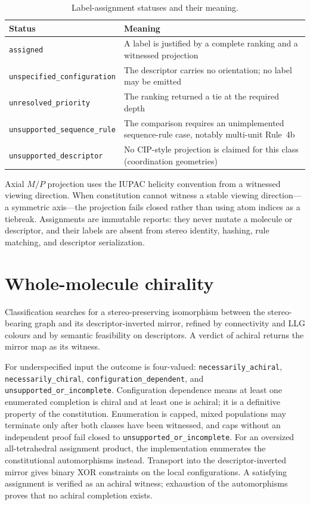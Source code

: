 \documentclass[pdflatex,sn-mathphys-num,referee,lineno]{sn-jnl}
\newcommand{\code}[1]{\texttt{#1}}
\theoremstyle{plain}
\theoremstyle{remark}
\theoremstyle{definition}
\begin{document}
\begin{table}[htbp]
\caption{Label-assignment statuses and their meaning.}
\label{tab:cipstatus}
\centering
\begin{tabularx}{\textwidth}{@{}lX@{}}
\toprule
Status & Meaning \\
\midrule
\code{assigned} & A label is justified by a complete ranking and a witnessed projection \\
\code{unspecified\_configuration} & The descriptor carries no orientation; no label may be emitted \\
\code{unresolved\_priority} & The ranking returned a tie at the required depth \\
\code{unsupported\_sequence\_rule} & The comparison requires an unimplemented sequence-rule case, notably multi-unit Rule~4b \\
\code{unsupported\_descriptor} & No CIP-style projection is claimed for this class (coordination geometries) \\
\bottomrule
\end{tabularx}
\end{table}

Axial \(M/P\) projection uses the IUPAC helicity convention from a witnessed
viewing direction.  When constitution cannot witness a stable viewing
direction---a symmetric axis---the projection fails closed rather than using
atom indices as a tiebreak.  Assignments are immutable reports: they never
mutate a molecule or descriptor, and their labels are absent from stereo
identity, hashing, rule matching, and descriptor serialization.

\section{Whole-molecule chirality}
\label{sec:si-chirality}

Classification searches for a stereo-preserving isomorphism between the
stereo-bearing graph and its descriptor-inverted mirror, refined by
connectivity and LLG colours and by semantic feasibility on
descriptors.  A verdict of achiral returns the mirror map as its witness.

For underspecified input the outcome is four-valued:
\code{necessarily\_achiral}, \code{necessarily\_chiral},
\code{configuration\_dependent}, and \code{unsupported\_or\_incomplete}.
Configuration dependence means at least one enumerated completion is chiral and
at least one is achiral; it is a definitive property of the constitution.
Enumeration is capped, mixed populations may terminate only after both classes
have been witnessed, and caps without an independent proof fail closed to
\code{unsupported\_or\_incomplete}.  For an oversized all-tetrahedral
assignment product, the implementation enumerates the constitutional
automorphisms instead.  Transport into the descriptor-inverted mirror gives
binary XOR constraints on the local configurations.  A satisfying assignment
is verified as an achiral witness; exhaustion of the automorphisms proves that
no achiral completion exists.
\end{document}
